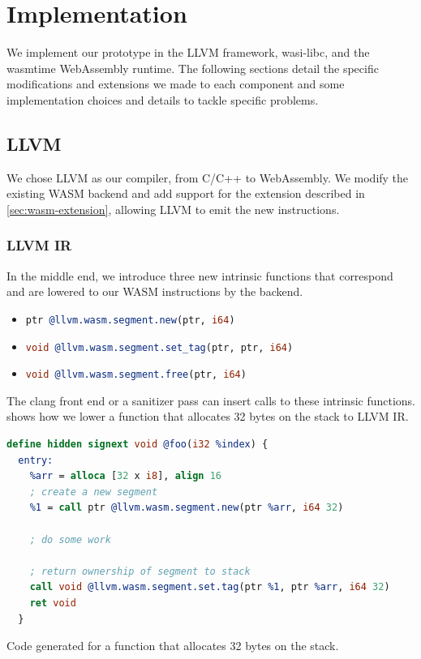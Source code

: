 \chapter{Implementation}
\label{ch:implementation}

We implement our prototype in the LLVM framework, wasi-libc, and the wasmtime WebAssembly runtime.
The following sections detail the specific modifications and extensions we made to each component and some implementation choices and details to tackle specific problems.

\section{LLVM}
\label{sec:llvm}

We chose LLVM as our compiler, from C/C++ to WebAssembly.
We modify the existing \ac{WASM} backend and add support for the extension described in \cref{sec:wasm-extension}, allowing LLVM to emit the new instructions.

\subsection{LLVM IR}
\label{subsec:llvm-ir}

In the middle end, we introduce three new intrinsic functions that correspond and are lowered to our \ac{WASM} instructions by the backend.

\begin{itemize}
  \item[] \lstinline[style=customc,language=llvm]{ptr @llvm.wasm.segment.new(ptr, i64)}
  \item[] \lstinline[style=customc,language=llvm]{void @llvm.wasm.segment.set_tag(ptr, ptr, i64)}
  \item[] \lstinline[style=customc,language=llvm]{void @llvm.wasm.segment.free(ptr, i64)}
\end{itemize}

\noindent
The clang front end or a sanitizer pass can insert calls to these intrinsic functions.
 shows how we lower a function that allocates 32 bytes on the stack to LLVM IR.

\begin{lstfloat}
  \begin{lstlisting}[frame=h,style=customc,
    label={lst:llvm-intrinsics},language=llvm]
  define hidden signext void @foo(i32 %index) {
  entry:
    %arr = alloca [32 x i8], align 16
    ; create a new segment
    %1 = call ptr @llvm.wasm.segment.new(ptr %arr, i64 32)

    ; do some work

    ; return ownership of segment to stack
    call void @llvm.wasm.segment.set.tag(ptr %1, ptr %arr, i64 32)
    ret void
  }
  \end{lstlisting}
  \caption{Code generated for a function that allocates 32 bytes on the stack.}
  \label{lst:llvm-intrinsics-float}
\end{lstfloat}

